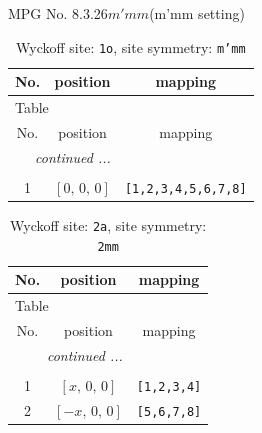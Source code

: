\documentclass[fleqn,8pt]{jsarticle}
\begin{document}
\setcounter{MaxMatrixCols}{32}

\renewcommand{\tablename}{Table~}
\renewcommand{\figurename}{Figure~}
\begin{center}
\LARGE
MPG No. 8.3.26\quad$m'mm$\quad(m'mm setting)
\end{center}
\renewcommand{\arraystretch}{1.2}
\begin{longtable}{ccc}
\caption{Wyckoff site: {\tt 1o}, site symmetry: {\tt m'mm}}
 \\
 \hline \hline
No. & position & mapping \\ \hline \endfirsthead

\multicolumn{2}{l}{\tablename\ \thetable{}} \\
 \hline \hline
No. & position & mapping \\ \hline \endhead

 \hline \hline
\multicolumn{2}{r}{\footnotesize\it continued ...} \\ \endfoot

 \hline \hline
\multicolumn{2}{r}{} \\ \endlastfoot

1 & $\left[ 0,\, 0,\, 0 \right]$ & {\tt [1,2,3,4,5,6,7,8]} \\
\end{longtable}
\renewcommand{\arraystretch}{1.2}
\begin{longtable}{ccc}
\caption{Wyckoff site: {\tt 2a}, site symmetry: {\tt 2mm}}
 \\
 \hline \hline
No. & position & mapping \\ \hline \endfirsthead

\multicolumn{2}{l}{\tablename\ \thetable{}} \\
 \hline \hline
No. & position & mapping \\ \hline \endhead

 \hline \hline
\multicolumn{2}{r}{\footnotesize\it continued ...} \\ \endfoot

 \hline \hline
\multicolumn{2}{r}{} \\ \endlastfoot

1 & $\left[ x,\, 0,\, 0 \right]$ & {\tt [1,2,3,4]} \\ \hline
2 & $\left[ - x,\, 0,\, 0 \right]$ & {\tt [5,6,7,8]} \\
\end{longtable}
\renewcommand{\arraystretch}{1.2}
\end{document}
